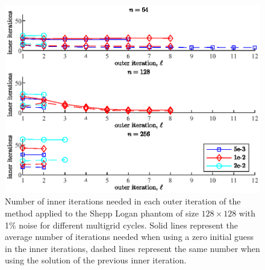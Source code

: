 \begin{figure}[htbp]
\begin{center}
\includegraphics{figures/inner_iteration_zero_initial_guess}
\caption{Number of inner iterations needed in each outer iteration of the method applied to the Shepp Logan phantom of size $128 \times 128$ with 1\% noise for different multigrid cycles. Solid lines represent the average number of iterations needed when using a zero initial guess in the inner iterations, dashed lines represent the same number when using the solution of the previous inner iteration.}
\label{fig:inner_iteration_zero_initial_guess}
\end{center}
\end{figure}


